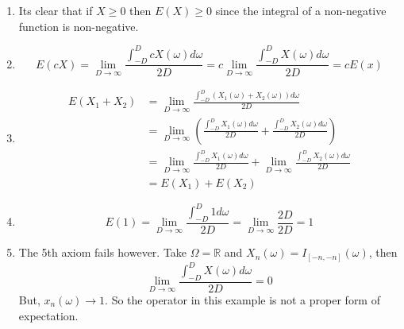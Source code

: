 \documentclass[openany]{report}
\begin{document}
\begin{enumerate}
    \item Its clear that if $X \geq 0$ then $E(X) \geq 0$ since the integral of a non-negative function is non-negative.
    \item 
    \[E(cX) = \lim_{D \rightarrow \infty} \frac{\int_{-D}^D cX(\omega) d\omega}{2D} = c\lim_{D \rightarrow \infty}\frac{\int_{-D}^DX(\omega)d\omega}{2D} =  cE(x)\]
    \item 
    \begin{align*}
        E(X_1 + X_2) &= \lim_{D \rightarrow \infty} \frac{\int_{-D}^D (X_1(\omega) + X_2(\omega)) d\omega}{2D}\\
        &=\lim_{D \rightarrow \infty} \left(\frac{\int_{-D}^D X_1(\omega) d\omega}{2D} + \frac{\int_{-D}^D X_2(\omega) d\omega}{2D}\right)\\
        &=\lim_{D \rightarrow \infty} \frac{\int_{-D}^D X_1(\omega) d\omega}{2D} + \lim_{D \rightarrow \infty}\frac{\int_{-D}^D X_2(\omega) d\omega}{2D}\\
        &= E(X_1) + E(X_2)
    \end{align*}
    \item 
    \[E(1) = \lim_{D \rightarrow \infty} \frac{\int_{-D}^D 1 d \omega}{2D} = \lim_{D\rightarrow \infty} \frac{2D}{2D} = 1\]
    \item 
    The 5th axiom fails however. Take $\Omega = \mathbb{R}$ and $X_n (\omega) = I_{[-n,-n]}(\omega)$, then 
    \[\lim_{D \rightarrow \infty} \frac{\int_{-D}^D X(\omega)d\omega}{2D} = 0\]
    But, $x_n(\omega) \rightarrow 1$. So the operator in this example is not a proper form of expectation. 
\end{enumerate}
\end{document}

